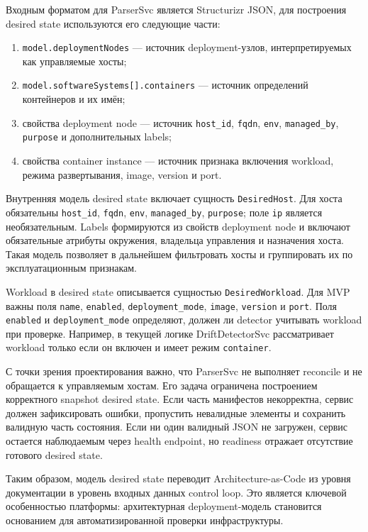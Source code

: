 Входным форматом для ParserSvc является Structurizr JSON, для построения desired state используются его следующие части:
\begin{enumerate}
    \item \texttt{model.deploymentNodes} --- источник deployment-узлов, интерпретируемых как управляемые хосты;
    \item \texttt{model.softwareSystems[].containers} --- источник определений контейнеров и их имён;
    \item свойства deployment node --- источник \texttt{host\_id}, \texttt{fqdn}, \texttt{env}, \texttt{managed\_by}, \texttt{purpose} и дополнительных labels;
    \item свойства container instance --- источник признака включения workload, режима развертывания, image, version и port.
\end{enumerate}

Внутренняя модель desired state включает сущность \texttt{DesiredHost}. Для хоста обязательны \texttt{host\_id}, \texttt{fqdn}, \texttt{env}, \texttt{managed\_by}, \texttt{purpose}; поле \texttt{ip} является необязательным. Labels формируются из свойств deployment node и включают обязательные атрибуты окружения, владельца управления и назначения хоста. Такая модель позволяет в дальнейшем фильтровать хосты и группировать их по эксплуатационным признакам.

Workload в desired state описывается сущностью \texttt{DesiredWorkload}. Для MVP важны поля \texttt{name}, \texttt{enabled}, \texttt{deployment\_mode}, \texttt{image}, \texttt{version} и \texttt{port}. Поля \texttt{enabled} и \texttt{deployment\_mode} определяют, должен ли detector учитывать workload при проверке. Например, в текущей логике DriftDetectorSvc рассматривает workload только если он включен и имеет режим \texttt{container}.

С точки зрения проектирования важно, что ParserSvc не выполняет reconcile и не обращается к управляемым хостам. Его задача ограничена построением корректного snapshot desired state. Если часть манифестов некорректна, сервис должен зафиксировать ошибки, пропустить невалидные элементы и сохранить валидную часть состояния. Если ни один валидный JSON не загружен, сервис остается наблюдаемым через health endpoint, но readiness отражает отсутствие готового desired state.

Таким образом, модель desired state переводит Architecture-as-Code из уровня документации в уровень входных данных control loop. Это является ключевой особенностью платформы: архитектурная deployment-модель становится основанием для автоматизированной проверки инфраструктуры.

